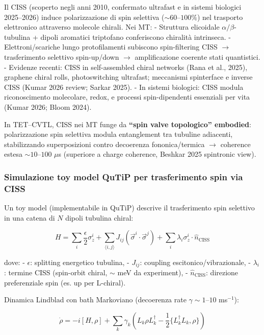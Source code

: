 \documentclass[11pt,a4paper]{article}
\theoremstyle{plain}
\theoremstyle{definition}
\begin{document}
Il CISS (scoperto negli anni 2010, confermato ultrafast e in sistemi biologici 2025--2026) induce polarizzazione di spin selettiva ($\sim 60$--$100\%$) nel trasporto elettronico attraverso molecole chirali. Nei MT:  
- Struttura elicoidale $\alpha/\beta$-tubulina + dipoli aromatici triptofano conferiscono chiralità intrinseca.  
- Elettroni/scariche lungo protofilamenti subiscono spin-filtering CISS $\to$ trasferimento selettivo spin-up/down $\to$ amplificazione coerente stati quantistici.  
- Evidenze recenti: CISS in self-assembled chiral networks (Rana et al., 2025), graphene chiral rolls, photoswitching ultrafast; meccanismi spinterface e inverse CISS (Kumar 2026 review; Sarkar 2025).  
- In sistemi biologici: CISS modula riconoscimento molecolare, redox, e processi spin-dipendenti essenziali per vita (Kumar 2026; Bloom 2024).

In TET–CVTL, CISS nei MT funge da \textbf{``spin valve topologico'' embodied}: polarizzazione spin selettiva modula entanglement tra tubuline adiacenti, stabilizzando superposizioni contro decoerenza fononica/termica $\to$ coherence estesa $\sim 10$--$100$ $\mu$s (superiore a charge coherence, Beshkar 2025 spintronic view).

\vspace{0.4cm}

\subsubsection{Simulazione toy model QuTiP per trasferimento spin via CISS}

Un toy model (implementabile in QuTiP) descrive il trasferimento spin selettivo in una catena di $N$ dipoli tubulina chiral:

\begin{equation}
H = \sum_{i} \frac{\epsilon}{2} \sigma_z^i + \sum_{\langle i,j \rangle} J_{ij} (\vec{\sigma}^i \cdot \vec{\sigma}^j) + \sum_i \lambda_i \sigma_z^i \cdot \hat{n}_{\text{CISS}}
\end{equation}

dove:  
- $\epsilon$: splitting energetico tubulina,  
- $J_{ij}$: coupling escitonico/vibrazionale,  
- $\lambda_i$: termine CISS (spin-orbit chiral, $\sim$ meV da experiment),  
- $\hat{n}_{\text{CISS}}$: direzione preferenziale spin (es. up per L-chiral).

Dinamica Lindblad con bath Markoviano (decoerenza rate $\gamma \sim 1$--$10$ ms$^{-1}$):

\begin{equation}
\dot{\rho} = -i[H, \rho] + \sum_k \gamma_k \left( L_k \rho L_k^\dagger - \frac{1}{2} \{ L_k^\dagger L_k, \rho \} \right)
\end{equation}
\end{document}
